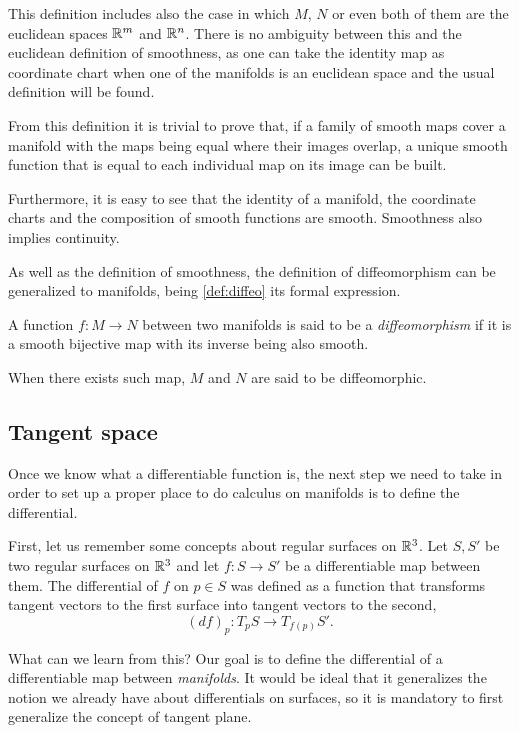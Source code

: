This definition includes also the case in which $M$, $N$ or even both of them are the euclidean spaces $\mathbb{R}^m$ and $\mathbb{R}^n$. There is no ambiguity between this and the euclidean definition of smoothness, as one can take the identity map as coordinate chart when one of the manifolds is an euclidean space and the usual definition will be found.

From this definition it is trivial to prove that, if a family of smooth maps cover a manifold with the maps being equal where their images overlap, a unique smooth function that is equal to each individual map on its image can be built.

Furthermore, it is easy to see that the identity of a manifold, the coordinate charts and the composition of smooth functions are smooth. Smoothness also implies continuity.

As well as the definition of smoothness, the definition of diffeomorphism can be generalized to manifolds, being \autoref{def:diffeo} its formal expression.

\begin{definition}[Diffeomorphism]
	\label{def:diffeo}
	A function $f \colon M \to N$ between two manifolds is said to be a \emph{diffeomorphism} if it is a smooth bijective map with its inverse being also smooth.
	
	When there exists such map, $M$ and $N$ are said to be diffeomorphic.
\end{definition}

\subsection{Tangent space}

Once we know what a differentiable function is, the next step we need to take in order to set up a proper place to do calculus on manifolds is to define the differential.

First, let us remember some concepts about regular surfaces on $\mathbb{R}^3$. Let $S, S'$ be two regular surfaces on $\mathbb{R}^3$ and let $f \colon S \to S'$ be a differentiable map between them. The differential of $f$ on $p \in S$ was defined as a function that transforms tangent vectors to the first surface into tangent vectors to the second,
\[
	(df)_p \colon T_p S \to T_{f(p)} S'.
\]

What can we learn from this? Our goal is to define the differential of a differentiable map between \emph{manifolds}. It would be ideal that it generalizes the notion we already have about differentials on surfaces, so it is mandatory to first generalize the concept of tangent plane.

